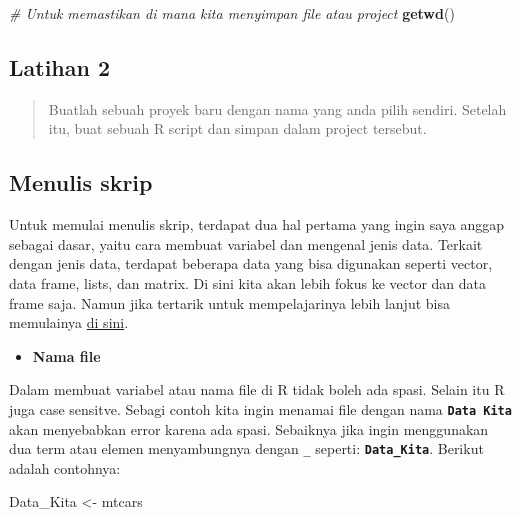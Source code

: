 \documentclass[]{book}
\newenvironment{Shaded}{\begin{snugshade}}{\end{snugshade}}
\newcommand{\CommentTok}[1]{\textcolor[rgb]{0.56,0.35,0.01}{\textit{#1}}}
\newcommand{\KeywordTok}[1]{\textcolor[rgb]{0.13,0.29,0.53}{\textbf{#1}}}
\newcommand{\NormalTok}[1]{#1}
\newcommand{\StringTok}[1]{\textcolor[rgb]{0.31,0.60,0.02}{#1}}
\providecommand{\tightlist}{%
  \setlength{\itemsep}{0pt}\setlength{\parskip}{0pt}}
\begin{document}
\begin{Shaded}
\begin{Highlighting}[]
\CommentTok{# Untuk memastikan di mana kita menyimpan file atau project}
\KeywordTok{getwd}\NormalTok{()}
\end{Highlighting}
\end{Shaded}

\hypertarget{latihan-2}{%
\subsection{Latihan 2}\label{latihan-2}}

\begin{quote}
Buatlah sebuah proyek baru dengan nama yang anda pilih sendiri. Setelah
itu, buat sebuah R script dan simpan dalam project tersebut.
\end{quote}

\hypertarget{menulis-skrip}{%
\subsection{Menulis skrip}\label{menulis-skrip}}

Untuk memulai menulis skrip, terdapat dua hal pertama yang ingin saya
anggap sebagai dasar, yaitu cara membuat variabel dan mengenal jenis
data. Terkait dengan jenis data, terdapat beberapa data yang bisa
digunakan seperti vector, data frame, lists, dan matrix. Di sini kita
akan lebih fokus ke vector dan data frame saja. Namun jika tertarik
untuk mempelajarinya lebih lanjut bisa memulainya
\href{https://www.r-bloggers.com/basic-data-types-in-r/}{di sini}.

\begin{itemize}
\tightlist
\item
  \textbf{Nama file}
\end{itemize}

Dalam membuat variabel atau nama file di R tidak boleh ada spasi. Selain
itu R juga case sensitve. Sebagi contoh kita ingin menamai file dengan
nama \textbf{\texttt{Data\ Kita}} akan menyebabkan error karena ada
spasi. Sebaiknya jika ingin menggunakan dua term atau elemen
menyambungnya dengan \texttt{\_} seperti: \textbf{\texttt{Data\_Kita}}.
Berikut adalah contohnya:

\begin{Shaded}
\begin{Highlighting}[]
\NormalTok{Data_Kita <-}\StringTok{ }\NormalTok{mtcars}
\end{Highlighting}
\end{Shaded}
\end{document}
